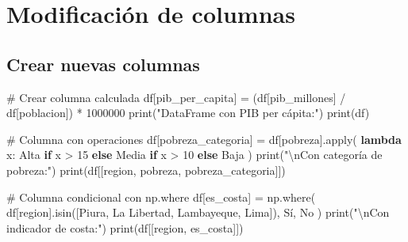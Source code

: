 \documentclass[
  doc,
  floatsintext,
  longtable,
  a4paper,
  nolmodern,
  notxfonts,
  notimes,
  12pt,
  colorlinks=true,linkcolor=blue,citecolor=blue,urlcolor=blue]{apa7}
\newenvironment{Shaded}{\begin{snugshade}}{\end{snugshade}}
\newcommand{\BuiltInTok}[1]{\textcolor[rgb]{0.00,0.23,0.31}{#1}}
\newcommand{\CharTok}[1]{\textcolor[rgb]{0.13,0.47,0.30}{#1}}
\newcommand{\CommentTok}[1]{\textcolor[rgb]{0.37,0.37,0.37}{#1}}
\newcommand{\ControlFlowTok}[1]{\textcolor[rgb]{0.00,0.23,0.31}{\textbf{#1}}}
\newcommand{\DecValTok}[1]{\textcolor[rgb]{0.68,0.00,0.00}{#1}}
\newcommand{\KeywordTok}[1]{\textcolor[rgb]{0.00,0.23,0.31}{\textbf{#1}}}
\newcommand{\NormalTok}[1]{\textcolor[rgb]{0.00,0.23,0.31}{#1}}
\newcommand{\OperatorTok}[1]{\textcolor[rgb]{0.37,0.37,0.37}{#1}}
\newcommand{\StringTok}[1]{\textcolor[rgb]{0.13,0.47,0.30}{#1}}
\begin{document}
\section{Modificación de columnas}\label{modificaciuxf3n-de-columnas}

\subsection{Crear nuevas columnas}\label{crear-nuevas-columnas}

\begin{Shaded}
\begin{Highlighting}[]
\CommentTok{\# Crear columna calculada}
\NormalTok{df[}\StringTok{\textquotesingle{}pib\_per\_capita\textquotesingle{}}\NormalTok{] }\OperatorTok{=}\NormalTok{ (df[}\StringTok{\textquotesingle{}pib\_millones\textquotesingle{}}\NormalTok{] }\OperatorTok{/}\NormalTok{ df[}\StringTok{\textquotesingle{}poblacion\textquotesingle{}}\NormalTok{]) }\OperatorTok{*} \DecValTok{1000000}
\BuiltInTok{print}\NormalTok{(}\StringTok{"DataFrame con PIB per cápita:"}\NormalTok{)}
\BuiltInTok{print}\NormalTok{(df)}

\CommentTok{\# Columna con operaciones}
\NormalTok{df[}\StringTok{\textquotesingle{}pobreza\_categoria\textquotesingle{}}\NormalTok{] }\OperatorTok{=}\NormalTok{ df[}\StringTok{\textquotesingle{}pobreza\textquotesingle{}}\NormalTok{].}\BuiltInTok{apply}\NormalTok{(}
    \KeywordTok{lambda}\NormalTok{ x: }\StringTok{\textquotesingle{}Alta\textquotesingle{}} \ControlFlowTok{if}\NormalTok{ x }\OperatorTok{\textgreater{}} \DecValTok{15} \ControlFlowTok{else} \StringTok{\textquotesingle{}Media\textquotesingle{}} \ControlFlowTok{if}\NormalTok{ x }\OperatorTok{\textgreater{}} \DecValTok{10} \ControlFlowTok{else} \StringTok{\textquotesingle{}Baja\textquotesingle{}}
\NormalTok{)}
\BuiltInTok{print}\NormalTok{(}\StringTok{"}\CharTok{\textbackslash{}n}\StringTok{Con categoría de pobreza:"}\NormalTok{)}
\BuiltInTok{print}\NormalTok{(df[[}\StringTok{\textquotesingle{}region\textquotesingle{}}\NormalTok{, }\StringTok{\textquotesingle{}pobreza\textquotesingle{}}\NormalTok{, }\StringTok{\textquotesingle{}pobreza\_categoria\textquotesingle{}}\NormalTok{]])}

\CommentTok{\# Columna condicional con np.where}
\NormalTok{df[}\StringTok{\textquotesingle{}es\_costa\textquotesingle{}}\NormalTok{] }\OperatorTok{=}\NormalTok{ np.where(}
\NormalTok{    df[}\StringTok{\textquotesingle{}region\textquotesingle{}}\NormalTok{].isin([}\StringTok{\textquotesingle{}Piura\textquotesingle{}}\NormalTok{, }\StringTok{\textquotesingle{}La Libertad\textquotesingle{}}\NormalTok{, }\StringTok{\textquotesingle{}Lambayeque\textquotesingle{}}\NormalTok{, }\StringTok{\textquotesingle{}Lima\textquotesingle{}}\NormalTok{]),}
    \StringTok{\textquotesingle{}Sí\textquotesingle{}}\NormalTok{,}
    \StringTok{\textquotesingle{}No\textquotesingle{}}
\NormalTok{)}
\BuiltInTok{print}\NormalTok{(}\StringTok{"}\CharTok{\textbackslash{}n}\StringTok{Con indicador de costa:"}\NormalTok{)}
\BuiltInTok{print}\NormalTok{(df[[}\StringTok{\textquotesingle{}region\textquotesingle{}}\NormalTok{, }\StringTok{\textquotesingle{}es\_costa\textquotesingle{}}\NormalTok{]])}


\end{Highlighting}
\end{Shaded}
\end{document}
